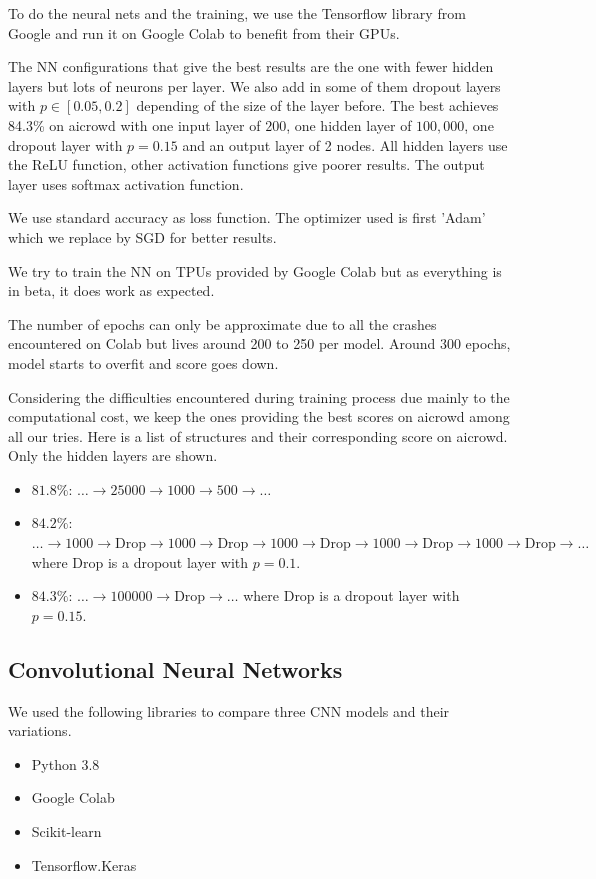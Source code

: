 \documentclass[11pt, a4paper, twocolumn]{article}
\begin{document}
To do the neural nets and the training, we use the Tensorflow library from Google and run it on Google Colab to benefit from their GPUs.

The NN configurations that give the best results are the one with 
fewer hidden layers but lots of neurons per layer. We also add in some of them dropout layers with $p\in [0.05, 0.2]$ 
depending of the size of the layer before\cite{dropoutkeras}.
The best achieves 84.3\% on aicrowd with one input layer of $200$, one hidden layer of $100,000$, one dropout 
layer with $p=0.15$ and an output layer of 2 nodes. All hidden layers use the ReLU function, other activation functions give poorer results. The output layer uses softmax activation function.

We use standard accuracy as loss function. The optimizer used is first 'Adam' which we replace by SGD for better results.

We try to train the NN on TPUs provided by Google Colab but as everything is in beta, it does work as expected.

The number of epochs can only be approximate due to all the crashes encountered on Colab but lives around 200 to 250 per model. Around 300 epochs, model starts to overfit and score goes down.

Considering the difficulties encountered during training process due mainly to the computational cost, we keep the ones providing the best scores on aicrowd among all our tries. 
Here is a list of structures and their corresponding score on aicrowd. Only the hidden layers are shown.
\begin{itemize}
  \item \textbf{$81.8\%$}: $\dots \rightarrow 25000\rightarrow 1000\rightarrow 500\rightarrow \dots$
  \item \textbf{$84.2\%$}: $\dots \rightarrow 1000\rightarrow \text{Drop}\rightarrow 1000
  \rightarrow \text{Drop}\rightarrow 1000\rightarrow \text{Drop}\rightarrow 1000
  \rightarrow \text{Drop}\rightarrow 1000\rightarrow \text{Drop}\rightarrow \dots$ where Drop is a dropout layer with $p=0.1$.
  \item \textbf{$84.3\%$}: $\dots \rightarrow 100000\rightarrow \text{Drop}\rightarrow \dots$ where Drop is a dropout layer with $p=0.15$. 
\end{itemize}

\subsection{Convolutional Neural Networks}
We used the following libraries to compare three CNN models and their variations.
\begin{itemize}
	\setlength\itemsep{1px}
	\item Python 3.8
	\item Google Colab
	\item Scikit-learn
	\item Tensorflow.Keras
\end{itemize}
\end{document}

